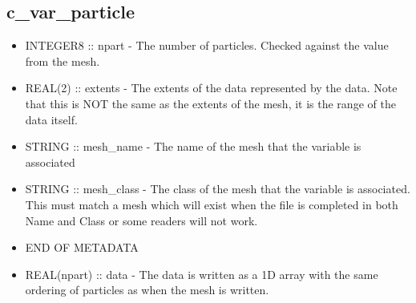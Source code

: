 \documentclass[8pt]{article} \usepackage{url,graphicx,tabularx,array}
\begin{document}
\subsection{c\_var\_particle}
\begin{itemize}
\item INTEGER8 :: npart - The number of particles. Checked against the value
  from the mesh.
\item REAL(2) :: extents - The extents of the data represented by the
  data. Note that this is NOT the same as the extents of the mesh, it is the
  range of the data itself.
\item STRING :: mesh\_name - The name of the mesh that the variable is
  associated
\item STRING :: mesh\_class - The class of the mesh that the variable is
  associated. This must match a mesh which will exist when the file is
  completed in both Name and Class or some readers will not work.
\item END OF METADATA
\item REAL(npart) :: data - The data is written as a 1D array with the same
  ordering of particles as when the mesh is written.
\end{itemize}
\end{document}
